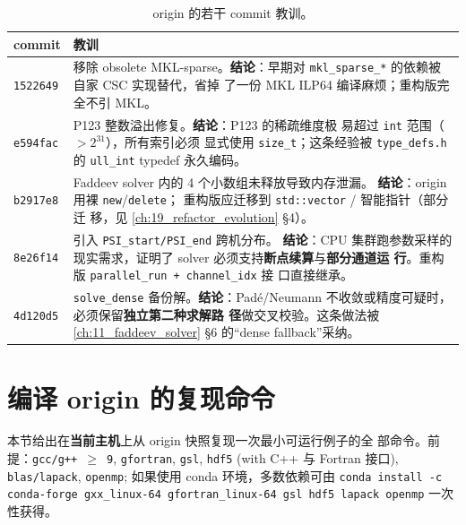 \begin{table}[ht]
\centering
\caption{origin 的若干 commit 教训。}
\label{tab:ch18-commit-lessons}
\small
\begin{tabular}{p{1.5cm}p{12cm}}
\toprule
\textbf{commit} & \textbf{教训} \\
\midrule
\texttt{1522649} & 移除 obsolete MKL-sparse。\textbf{结论}：早期对
                   \texttt{mkl\_sparse\_*} 的依赖被自家 CSC 实现替代，省掉
                   了一份 MKL ILP64 编译麻烦；重构版完全不引 MKL。\\
\texttt{e594fac} & P123 整数溢出修复。\textbf{结论}：P123 的稀疏维度极
                   易超过 \texttt{int} 范围（${>} 2^{31}$），所有索引必须
                   显式使用 \texttt{size\_t}；这条经验被 \texttt{type\_defs.h}
                   的 \texttt{ull\_int} typedef 永久编码。 \\
\texttt{b2917e8} & Faddeev solver 内的 4 个小数组未释放导致内存泄漏。
                   \textbf{结论}：origin 用裸 \texttt{new}/\texttt{delete}；
                   重构版应迁移到 \texttt{std::vector} / 智能指针（部分迁
                   移，见 \cref{ch:19_refactor_evolution} §4）。 \\
\texttt{8e26f14} & 引入 \texttt{PSI\_start/PSI\_end} 跨机分布。
                   \textbf{结论}：CPU 集群跑参数采样的现实需求，证明了
                   solver 必须支持\textbf{断点续算}与\textbf{部分通道运
                   行}。重构版 \texttt{parallel\_run + channel\_idx} 接
                   口直接继承。 \\
\texttt{4d120d5} & \texttt{solve\_dense} 备份解。\textbf{结论}：Padé/Neumann
                   不收敛或精度可疑时，必须保留\textbf{独立第二种求解路
                   径}做交叉校验。这条做法被 \cref{ch:11_faddeev_solver}
                   §6 的“dense fallback”采纳。 \\
\bottomrule
\end{tabular}
\end{table}

\section{编译 origin 的复现命令}
\label{sec:ch18-reproduce}

本节给出在\textbf{当前主机}上从 origin 快照复现一次最小可运行例子的全
部命令。前提：\texttt{gcc/g++ $\ge$ 9}, \texttt{gfortran}, \texttt{gsl},
\texttt{hdf5} (with C++ 与 Fortran 接口), \texttt{blas/lapack},
\texttt{openmp}; 如果使用 conda 环境，多数依赖可由
\texttt{conda install -c conda-forge gxx\_linux-64 gfortran\_linux-64
gsl hdf5 lapack openmp} 一次性获得。

